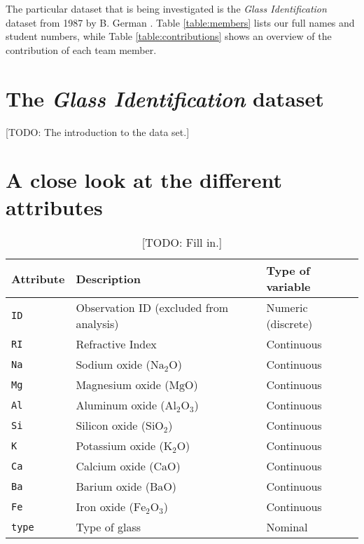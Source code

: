 \documentclass[dtu]{dtuarticle}
\newcommand{\todo}[1]{\color{red}[TODO: #1]\color{black}}
\newcommand*\chem[1]{\ensuremath{\mathrm{#1}}}
\begin{document}
	The particular dataset that is being investigated is the \textit{Glass Identification} dataset from 1987 by B. German \cite{dataset}. Table \ref{table:members} lists our full names and student numbers, while Table \ref{table:contributions} shows an overview of the contribution of each team member.

	\tableofcontents

	\newpage

	\section{The \textit{Glass Identification} dataset}

	\todo{The introduction to the data set.}

	\section{A close look at the different attributes}

	\begin{table}[h!]
		\centering
		\begin{tabular}{l|l|l}
			\textbf{Attribute} & \textbf{Description}                    & \textbf{Type of variable} \\ \hline \hline
			\texttt{ID}        & Observation ID (excluded from analysis) & Numeric (discrete)        \\ \hline
			\texttt{RI}        & Refractive Index                        & Continuous                \\ \hline
			\texttt{Na}        & Sodium oxide ($\chem{Na_2 O}$)          & Continuous                \\ \hline
			\texttt{Mg}        & Magnesium oxide ($\chem{Mg O}$)         & Continuous                \\ \hline
			\texttt{Al}        & Aluminum oxide ($\chem{Al_2 O_3}$)      & Continuous                \\ \hline
			\texttt{Si}        & Silicon oxide ($\chem{Si O_2}$)         & Continuous                \\ \hline
			\texttt{K}         & Potassium oxide ($\chem{K_2 O}$)        & Continuous                \\ \hline
			\texttt{Ca}        & Calcium oxide ($\chem{Ca O }$)          & Continuous                \\ \hline
			\texttt{Ba}        & Barium oxide ($\chem{Ba O}$)            & Continuous                \\ \hline
			\texttt{Fe}        & Iron oxide ($\chem{Fe_2 O_3}$)          & Continuous                \\ \hline
			\texttt{type}      & Type of glass                           & Nominal                   \\
		\end{tabular}
		\caption{\todo{Fill in.}}
		\label{table:attributes}
	\end{table}
\end{document}
